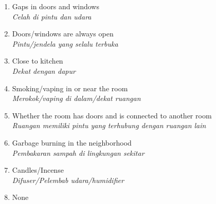 \documentclass[reqno,12pt,notitlepage]{article}
\begin{document}
\begin{enumerate}
    \begin{enumerate}
        \item Gaps in doors and windows \\ \textit{Celah di pintu dan udara}
        \item Doors/windows are always open \\ \textit{Pintu/jendela yang selalu terbuka}
        \item Close to kitchen \\ \textit{Dekat dengan dapur} 
        \item Smoking/vaping in or near the room \\ \textit{Merokok/vaping di dalam/dekat ruangan}
        \item Whether the room has doors and is connected to another room \\ \textit{Ruangan memiliki pintu yang terhubung dengan ruangan lain}
        \item Garbage burning in the neighborhood \\ \textit{Pembakaran sampah di lingkungan sekitar}
        \item Candles/Incense \\ \textit{Difuser/Pelembab udara/humidifier}
        \item None
    \end{enumerate}

    
\end{enumerate}
\end{document}

